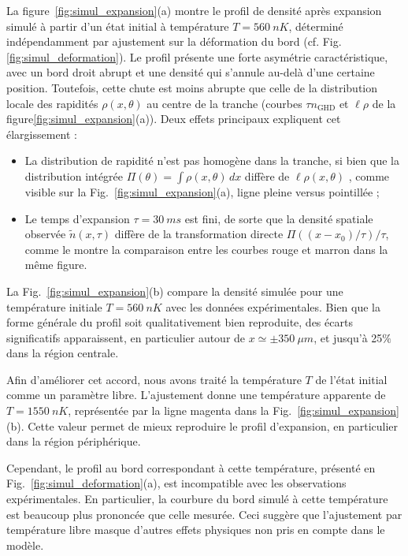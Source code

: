 \medskip

La figure~\ref{fig:simul_expansion}(a) montre le profil de densité après expansion simulé à partir d’un état initial à température $T = 560~nK$, déterminé indépendamment par ajustement sur la déformation du bord (cf. Fig.\ref{fig:simul_deformation}). Le profil présente une forte asymétrie caractéristique, avec un bord droit abrupt et une densité qui s'annule au-delà d’une certaine position. Toutefois, cette chute est moins abrupte que celle de la distribution locale des rapidités $\rho(x, \theta)$ au centre de la tranche (courbes $\tau n_{\mathrm{GHD}}$ et $\ell \rho$ de la figure\ref{fig:simul_expansion}(a)). Deux effets principaux expliquent cet élargissement :
\begin{itemize}
	\item[(i)] La distribution de rapidité n’est pas homogène dans la tranche, si bien que la distribution intégrée $\Pi(\theta) = \int \rho(x,\theta) \, dx $  diffère de $\ell \rho(x , \theta )$ , comme visible sur la Fig.~\ref{fig:simul_expansion}(a), ligne pleine versus pointillée ;
	\item[(ii)] Le temps d’expansion $\tau =30~ ms$ est fini, de sorte que la densité spatiale observée $\tilde{n}(x , \tau )$ diffère de la transformation directe $\Pi( (x-x_0)/\tau) /\tau $, comme le montre la comparaison entre les courbes rouge et marron dans la même figure.
\end{itemize}

\medskip

La Fig.~\ref{fig:simul_expansion}(b) compare la densité simulée pour une température initiale  $T=560~nK$ avec les données expérimentales. Bien que la forme générale du profil soit qualitativement bien reproduite, des écarts significatifs apparaissent, en particulier autour de $x \simeq \pm 350 ~\mu m$, et jusqu’à 25$\%$ dans la région centrale.

\medskip

Afin d’améliorer cet accord, nous avons traité la température $T$ de l’état initial comme un paramètre libre. L’ajustement donne une température apparente de $T=1550~nK$, représentée par la ligne magenta dans la Fig.~\ref{fig:simul_expansion}(b). Cette valeur permet de mieux reproduire le profil d’expansion, en particulier dans la région périphérique.

\medskip

Cependant, le profil au bord correspondant à cette température, présenté en Fig.~\ref{fig:simul_deformation}(a), est incompatible avec les observations expérimentales. En particulier, la courbure du bord simulé à cette température est beaucoup plus prononcée que celle mesurée. Ceci suggère que l’ajustement par température libre masque d'autres effets physiques non pris en compte dans le modèle.

